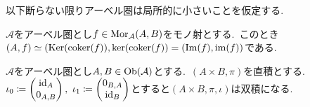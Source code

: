 \begin{remark} \label{rem: abelian_locally_small}
以下断らない限りアーベル圏は局所的に小さいことを仮定する.\
\end{remark}

\begin{proposition} \label{prop: image_iso_of_mono}
$\mathcal{A}$をアーベル圏とし$f \in \operatorname{Mor}_{\mathcal{A}}(A, B)$をモノ射とする.\
このとき$(A, f) \simeq (\operatorname{Ker}(\operatorname{coker}(f)), \ker(\operatorname{coker}(f)) = (\operatorname{Im}(f), \operatorname{im}(f))$である.\
\end{proposition}

\begin{proposition} \label{prop: Abelian.biproduct_of_direct_product}
$\mathcal{A}$をアーベル圏とし$A, B \in \operatorname{Ob}(\mathcal{A})$とする.\
$(A \times B, \pi)$を直積とする.
$\iota_0 \coloneq \begin{pmatrix} \operatorname{id}_A \\ 0_{A,B} \end{pmatrix},\ \iota_1 \coloneq \begin{pmatrix} 0_{B,A} \\ \operatorname{id}_B \end{pmatrix}$とすると$(A \times B, \pi, \iota)$は双積になる.
\end{proposition}

